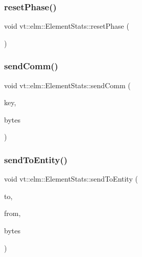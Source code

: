 \subsubsection{\texorpdfstring{reset\+Phase()}{resetPhase()}}
{\footnotesize\ttfamily void vt\+::elm\+::\+Element\+Stats\+::reset\+Phase (\begin{DoxyParamCaption}{ }\end{DoxyParamCaption})}

\mbox{\label{structvt_1_1elm_1_1_element_stats_a43ee151dce76d5480f2121e8b2deaac2}} 
\subsubsection{\texorpdfstring{send\+Comm()}{sendComm()}}
{\footnotesize\ttfamily void vt\+::elm\+::\+Element\+Stats\+::send\+Comm (\begin{DoxyParamCaption}\item[{\hyperlink{structvt_1_1elm_1_1_comm_key}{elm\+::\+Comm\+Key}}]{key,  }\item[{double}]{bytes }\end{DoxyParamCaption})}

\mbox{\label{structvt_1_1elm_1_1_element_stats_af9452e09210ecdfae2b1759ee1b1fb91}} 
\subsubsection{\texorpdfstring{send\+To\+Entity()}{sendToEntity()}}
{\footnotesize\ttfamily void vt\+::elm\+::\+Element\+Stats\+::send\+To\+Entity (\begin{DoxyParamCaption}\item[{\hyperlink{structvt_1_1elm_1_1_element_i_d_struct}{Element\+I\+D\+Struct}}]{to,  }\item[{\hyperlink{structvt_1_1elm_1_1_element_i_d_struct}{Element\+I\+D\+Struct}}]{from,  }\item[{double}]{bytes }\end{DoxyParamCaption})}

